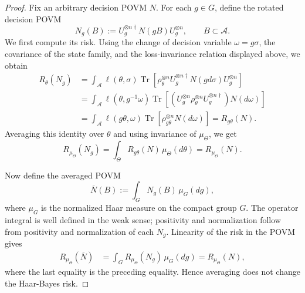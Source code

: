 \documentclass[10pt,a4paper]{amsart}
\begin{document}
\begin{proof}
Fix an
arbitrary decision POVM \(N\).  For each \(g\in G\), define the rotated decision
POVM
\[
    N_g(B)
    :=
    U_g^{\otimes n\dagger}N(gB)U_g^{\otimes n},
    \qquad B\subset\mathcal A.
    \label{eq:rotated_decision_povm_def}
\]
We first compute its risk.  Using the change of decision variable
\(\omega=g\sigma\), the covariance of the state family, and the
loss-invariance relation displayed above, we obtain
\[
\begin{aligned}
    R_\theta(N_g)
    &=
    \int_{\mathcal A}
    \ell(\theta,\sigma)
    \operatorname{Tr}\!\left[
        \rho_\theta^{\otimes n}
        U_g^{\otimes n\dagger}N(gd\sigma)U_g^{\otimes n}
    \right]                                                   \\
    &=
    \int_{\mathcal A}
    \ell(\theta,g^{-1}\omega)
    \operatorname{Tr}\!\left[
        (U_g^{\otimes n}\rho_\theta^{\otimes n}U_g^{\otimes n\dagger})
        N(d\omega)
    \right]                                                   \\
    &=
    \int_{\mathcal A}
    \ell(g\theta,\omega)
    \operatorname{Tr}\!\left[
        \rho_{g\theta}^{\otimes n}N(d\omega)
    \right]                                                   
    =
    R_{g\theta}(N).
\end{aligned}
\]
Averaging this identity over \(\theta\) and using invariance of
\(\mu_\Theta\), we get
\[
    R_{\mu_\Theta}(N_g)
    =
    \int_\Theta R_{g\theta}(N)\,\mu_\Theta(d\theta)
    =
    R_{\mu_\Theta}(N).
\]

Now define the averaged POVM
\[
    \overline N(B)
    :=
    \int_G N_g(B)\,\mu_G(dg),
    \label{eq:averaged_decision_povm_def}
\]
where \(\mu_G\) is the normalized Haar measure on the compact group \(G\).  The
operator integral is well defined in the weak sense; positivity and
normalization follow from positivity and normalization of each \(N_g\).
Linearity of the risk in the POVM gives
\[
\begin{aligned}
    R_{\mu_\Theta}(\overline N)
    &=
    \int_G R_{\mu_\Theta}(N_g)\,\mu_G(dg) 
    =
    R_{\mu_\Theta}(N),
\end{aligned}
\]
where the last equality is the preceding equality.  Hence averaging
does not change the Haar-Bayes risk.


\end{proof}
\end{document}

